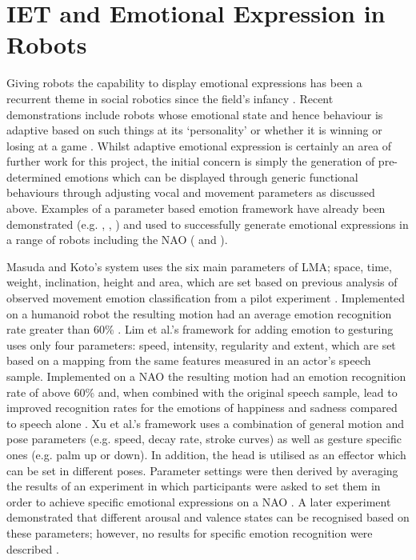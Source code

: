 \documentclass[11pt,a4paper]{report}
\begin{document}
\section{IET and Emotional Expression in Robots}
Giving robots the capability to display emotional expressions has been a recurrent theme in social robotics since the field's infancy \cite{breazeal1999build}. Recent demonstrations include robots whose emotional state and hence behaviour is adaptive based on such things at its `personality' \cite{park2009robot} or whether it is winning or losing at a game \cite{tielman2014adaptive}. Whilst adaptive emotional expression is certainly an area of further work for this project, the initial concern is simply the generation of pre-determined emotions which can be displayed through generic functional behaviours through adjusting vocal and movement parameters as discussed above. Examples of a parameter based emotion framework have already been demonstrated (e.g. \cite{masuda2010motion}, \cite{lim2011converting}, \cite{xu2013mood}) and used to successfully generate emotional expressions in a range of robots including the NAO (\cite{lim2011converting} and \cite{xu2013mood}). 

Masuda and Koto's system uses the six main parameters of LMA; space, time, weight, inclination, height and area, which are set based on previous analysis of observed movement emotion classification from a pilot experiment \cite{masuda2009emotion}. Implemented on a humanoid robot the resulting motion had an average emotion recognition rate greater than 60\% \cite{masuda2010motion}. Lim et al.'s framework for adding emotion to gesturing uses only four parameters: speed, intensity, regularity and extent, which are set based on a mapping from the same features measured in an actor's speech sample. Implemented on a NAO the resulting motion had an emotion recognition rate of above 60\% and, when combined with the original speech sample, lead to improved recognition rates for the emotions of happiness and sadness compared to speech alone \cite{lim2011converting}. Xu et al.'s framework uses a combination of general motion and pose parameters (e.g. speed, decay rate, stroke curves) as well as gesture specific ones (e.g. palm up or down). In addition, the head is utilised as an effector which can be set in different poses. Parameter settings were then derived by averaging the results of an experiment in which participants were asked to set them in order to achieve specific emotional expressions on a NAO \cite{xu2013mood}. A later experiment demonstrated that different arousal and valence states can be recognised based on these parameters; however, no results for specific emotion recognition were described \cite{xu2013bodily}.
\end{document}
